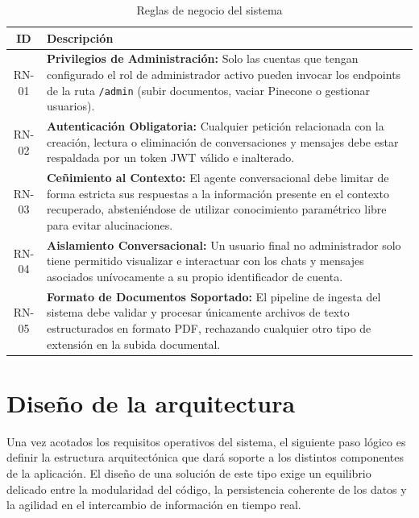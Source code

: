 \documentclass[12pt,a4paper,oneside]{report}
\begin{document}
\begin{table}[H]
    \centering
    \caption{Reglas de negocio del sistema}
    \begin{tabular}{@{}cp{12cm}@{}}
        \toprule
        \textbf{ID} & \textbf{Descripción}                                                                                     \\
        \midrule
        RN-01      & \textbf{Privilegios de Administración:} Solo las cuentas que tengan configurado el rol de administrador activo pueden invocar los endpoints de la ruta \texttt{/admin} (subir documentos, vaciar Pinecone o gestionar usuarios). \\
        RN-02      & \textbf{Autenticación Obligatoria:} Cualquier petición relacionada con la creación, lectura o eliminación de conversaciones y mensajes debe estar respaldada por un token JWT válido e inalterado. \\
        RN-03      & \textbf{Ceñimiento al Contexto:} El agente conversacional debe limitar de forma estricta sus respuestas a la información presente en el contexto recuperado, absteniéndose de utilizar conocimiento paramétrico libre para evitar alucinaciones. \\
        RN-04      & \textbf{Aislamiento Conversacional:} Un usuario final no administrador solo tiene permitido visualizar e interactuar con los chats y mensajes asociados unívocamente a su propio identificador de cuenta. \\
        RN-05      & \textbf{Formato de Documentos Soportado:} El pipeline de ingesta del sistema debe validar y procesar únicamente archivos de texto estructurados en formato PDF, rechazando cualquier otro tipo de extensión en la subida documental. \\
        \bottomrule
    \end{tabular}
\end{table}

\chapter{Diseño de la arquitectura}

Una vez acotados los requisitos operativos del sistema, el siguiente paso lógico es definir la estructura arquitectónica que dará soporte a los distintos componentes de la aplicación. El diseño de una solución de este tipo exige un equilibrio delicado entre la modularidad del código, la persistencia coherente de los datos y la agilidad en el intercambio de información en tiempo real.
\end{document}
